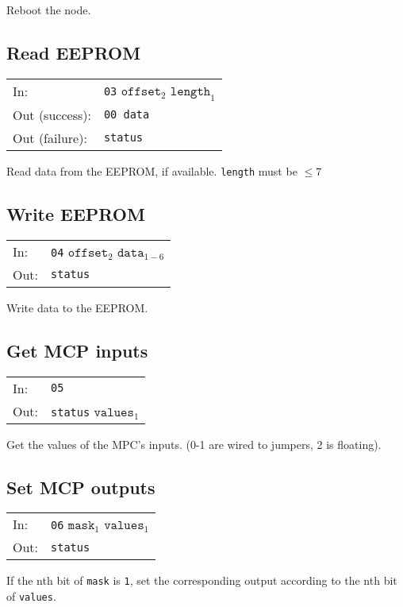 \documentclass[a4paper]{scrartcl}
\begin{document}
Reboot the node.

\subsection{Read EEPROM}
\begin{tabular}{ll}
  In: & \texttt{03} $\texttt{offset}_{2}$ $\texttt{length}_{1}$ \\
  Out (success): & \texttt{00 data} \\
  Out (failure): & \texttt{status}
\end{tabular}
\vspace{5pt}

Read data from the EEPROM, if available. \texttt{length} must be $\leq
7$

\subsection{Write EEPROM}
\begin{tabular}{ll}
  In: & \texttt{04} $\texttt{offset}_{2}$ $\texttt{data}_{1-6}$ \\
  Out: & \texttt{status}
\end{tabular}
\vspace{5pt}

Write data to the EEPROM.

\subsection{Get MCP inputs}
\begin{tabular}{ll}
  In: & \texttt{05} \\
  Out: & \texttt{status} $\texttt{values}_1$
\end{tabular}
\vspace{5pt}

Get the values of the MPC's inputs. (0-1 are wired to jumpers, 2 is floating).

\subsection{Set MCP outputs}
\begin{tabular}{ll}
  In: & \texttt{06} $\texttt{mask}_{1}$ $\texttt{values}_{1}$ \\
  Out: & \texttt{status}
\end{tabular}
\vspace{5pt}

If the nth bit of \texttt{mask} is \texttt{1}, set the corresponding output according
to the nth bit of \texttt{values}.
\end{document}
